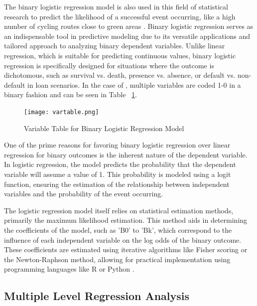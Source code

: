 \documentclass[12pt, letterpaper]{article}
\begin{document}
The binary logistic regression model is also used in this field of statistical research to predict the likelihood of a successful event occurring, like a high number of cycling routes close to green areas \cite{5CamposSnchez2019}. Binary logistic regression serves as an indispensable tool in predictive modeling due to its versatile applications and tailored approach to analyzing binary dependent variables. Unlike linear regression, which is suitable for predicting continuous values, binary logistic regression is specifically designed for situations where the outcome is dichotomous, such as survival vs. death, presence vs. absence, or default vs. non-default in loan scenarios. In the case of \citet{5CamposSnchez2019}, multiple variables are coded 1-0 in a binary fashion and can be seen in Table ~\ref{fig:vartable}. \par
\begin{figure}[hbt!]
    \centering \texttt{[image: vartable.png]}
    \caption{Variable Table for Binary Logistic Regression Model}
    \label{fig:vartable}
\end{figure}

One of the prime reasons for favoring binary logistic regression over linear regression for binary outcomes is the inherent nature of the dependent variable. In logistic regression, the model predicts the probability that the dependent variable will assume a value of 1. This probability is modeled using a logit function, ensuring the estimation of the relationship between independent variables and the probability of the event occurring.

The logistic regression model itself relies on statistical estimation methods, primarily the maximum likelihood estimation. This method aids in determining the coefficients of the model, such as 'B0' to 'Bk', which correspond to the influence of each independent variable on the log odds of the binary outcome. These coefficients are estimated using iterative algorithms like Fisher scoring or the Newton-Raphson method, allowing for practical implementation using programming languages like R or Python \cite{Penman_2022}.

\subsection{Multiple Level  Regression Analysis}
\label{sec:mult}
\end{document}
